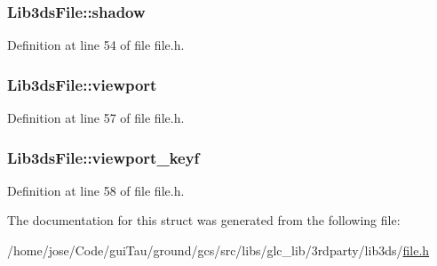 \hypertarget{struct_lib3ds_file_abea0efedbe9d385f5d71a9186d6d46c6}{
\subsubsection[{shadow}]{ Lib3ds\-File\-::shadow}}\label{struct_lib3ds_file_abea0efedbe9d385f5d71a9186d6d46c6}


Definition at line 54 of file file.\-h.

\hypertarget{struct_lib3ds_file_a60d3cef68741b6ee25e4a6e892ddedb7}{
\subsubsection[{viewport}]{ Lib3ds\-File\-::viewport}}\label{struct_lib3ds_file_a60d3cef68741b6ee25e4a6e892ddedb7}


Definition at line 57 of file file.\-h.

\hypertarget{struct_lib3ds_file_ad8ef9da2d814e87e71a614716c2f1a27}{
\subsubsection[{viewport\-\_\-keyf}]{ Lib3ds\-File\-::viewport\-\_\-keyf}}\label{struct_lib3ds_file_ad8ef9da2d814e87e71a614716c2f1a27}


Definition at line 58 of file file.\-h.



The documentation for this struct was generated from the following file\-:\begin{DoxyCompactItemize}
\item 
/home/jose/\-Code/gui\-Tau/ground/gcs/src/libs/glc\-\_\-lib/3rdparty/lib3ds/\hyperlink{file_8h}{file.\-h}\end{DoxyCompactItemize}
